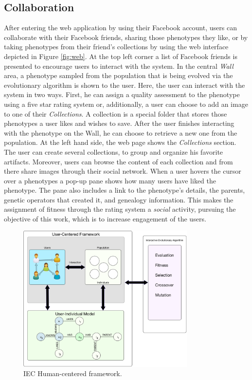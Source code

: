 \documentclass[conference]{IEEEtran}
\begin{document}
\subsection{Collaboration}
\label{sec:col}
After entering the web application by using their Facebook account,
users can collaborate with their Facebook friends, 
sharing those phenotypes they like, or by taking phenotypes
from their friend's collections by using the web interface depicted 
in Figure \ref{fig:web}.
At the top left corner a list of Facebook friends is presented
to encourage users to interact with the system. In the central 
\emph{ Wall } area, a phenotype sampled from the population that is
being evolved via the evolutionary algorithm 
is shown to the user.
Here, the user can interact with the system in two ways.
First, he can assign a quality assessment to the phenotype using
a five star rating system or,
additionally, a user can choose to add an image to one of their \emph{Collections}.
A collection is a special folder that stores those phenotypes a user likes and wishes
to save. After the user finishes interacting with the phenotype
on the Wall, he can choose to retrieve a new one from the population.
At the left hand side, the web page shows the \emph{Collections} section.
The user can create several collections, to group and organize his favorite 
artifacts. Moreover, users can browse the content of each collection and from
there share images through their social network.
When a user hovers the cursor over a phenotypes a pop-up pane shows how many users have
liked the phenotype. The pane also includes a link to the phenotype's 
details, the parents, genetic operators that created it, and genealogy
information. This makes the assignment of fitness through the rating
system a {\em social} activity, pursuing the objective of this work,
which is to increase engagement of the users. %

\begin{figure}[!t]
    \centering
        \includegraphics[width=3.5in]{img/framework.png}
    \caption{IEC Human-centered framework.}
    \label{fig:uc_framework}
\end{figure}
\end{document}
